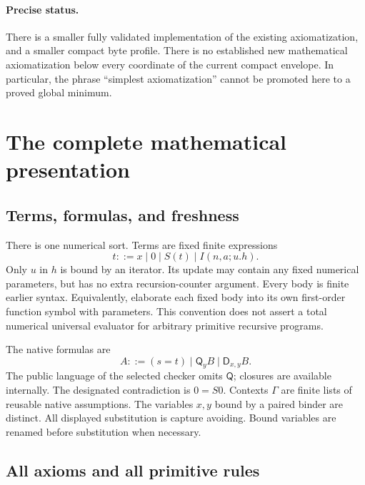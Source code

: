 \documentclass[11pt]{article}
\theoremstyle{definition}\newtheorem{definition}[theorem]{Definition}
\theoremstyle{remark}\newtheorem{remark}[theorem]{Remark}
\newcommand{\D}{\mathsf D}
\newcommand{\Q}{\mathsf Q}
\begin{document}
\paragraph{Precise status.}
There is a smaller fully validated implementation of the existing
axiomatization, and a smaller compact byte profile. There is no established
new mathematical axiomatization below every coordinate of the current
compact envelope. In particular, the phrase ``simplest axiomatization''
cannot be promoted here to a proved global minimum.

\section{The complete mathematical presentation}
\label{main:calculus}

\subsection{Terms, formulas, and freshness}

There is one numerical sort. Terms are fixed finite expressions
\[
 t ::= x\mid 0\mid S(t)\mid I(n,a;u.h).
\]
Only \(u\) in \(h\) is bound by an iterator. Its update may contain any fixed
numerical parameters, but has no extra recursion-counter argument. Every
body is finite earlier syntax. Equivalently, elaborate each fixed body into
its own first-order function symbol with parameters. This convention does
not assert a total numerical universal evaluator for arbitrary primitive
recursive programs.

The native formulas are
\[
 A ::= (s=t)\mid \Q_y B\mid\D_{x,y}B.
\]
The public language of the selected checker omits \(\Q\); closures are
available internally. The designated contradiction is \(0=S0\).
Contexts \(\Gamma\) are finite lists of reusable native assumptions.
The variables \(x,y\) bound by a paired binder are distinct.
All displayed substitution is capture avoiding. Bound variables are renamed
before substitution when necessary.

\subsection{All axioms and all primitive rules}
\end{document}
